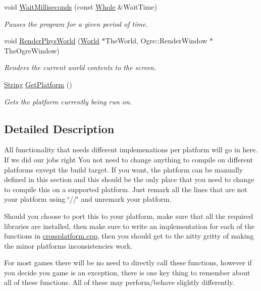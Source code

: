 \begin{DoxyCompactItemize}
void \hyperlink{namespacephys_1_1crossplatform_ab525e3abf3625b83954e2d55a5869d18}{WaitMilliseconds} (const \hyperlink{namespacephys_a460f6bc24c8dd347b05e0366ae34f34a}{Whole} \&WaitTime)
\begin{DoxyCompactList}\small\item\em Pauses the program for a given period of time. \item\end{DoxyCompactList}\item 
void \hyperlink{namespacephys_1_1crossplatform_a11ab7359564519dc966f997c98109f6e}{RenderPhysWorld} (\hyperlink{classphys_1_1World}{World} $\ast$TheWorld, Ogre::RenderWindow $\ast$TheOgreWindow)
\begin{DoxyCompactList}\small\item\em Renders the current world contents to the screen. \item\end{DoxyCompactList}\item 
\hyperlink{namespacephys_aa03900411993de7fbfec4789bc1d392e}{String} \hyperlink{namespacephys_1_1crossplatform_af34fd6dc13360417a87c579744932dce}{GetPlatform} ()
\begin{DoxyCompactList}\small\item\em Gets the platform currently being run on. \item\end{DoxyCompactList}\end{DoxyCompactItemize}


\subsection{Detailed Description}
All functionality that needs different implemenations per platform will go in here. If we did our jobs right You not need to change anything to compile on different platforms exvept the build target. If you want, the platform can be manually defined in this section and this should be the only place that you need to change to compile this on a supported platform. Just remark all the lines that are not your platform using \char`\"{}//\char`\"{} and unremark your platform. \par
\par
 Should you choose to port this to your platform, make sure that all the required libraries are installed, then make sure to write an implementation for each of the functions in \hyperlink{crossplatform_8cpp_source}{crossplatform.cpp}, then you should get to the nitty gritty of making the minor platforms inconsistencies work. \par
\par
 For most games there will be no need to directly call these functions, however if you decide you game is an exception, there is one key thing to remember about all of these functions. All of these may perform/behave slightly differently. 

